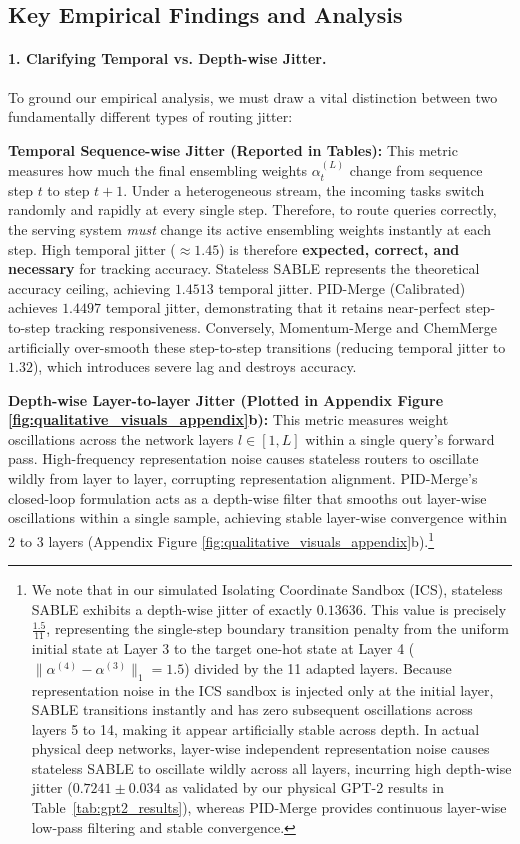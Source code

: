 \subsection{Key Empirical Findings and Analysis}

\paragraph{1. Clarifying Temporal vs. Depth-wise Jitter.}
To ground our empirical analysis, we must draw a vital distinction between two fundamentally different types of routing jitter:

\textbf{Temporal Sequence-wise Jitter (Reported in Tables):} This metric measures how much the final ensembling weights $\alpha_t^{(L)}$ change from sequence step $t$ to step $t+1$. Under a heterogeneous stream, the incoming tasks switch randomly and rapidly at every single step. Therefore, to route queries correctly, the serving system \emph{must} change its active ensembling weights instantly at each step. High temporal jitter ($\approx 1.45$) is therefore \textbf{expected, correct, and necessary} for tracking accuracy. Stateless SABLE represents the theoretical accuracy ceiling, achieving $1.4513$ temporal jitter. PID-Merge (Calibrated) achieves $1.4497$ temporal jitter, demonstrating that it retains near-perfect step-to-step tracking responsiveness. Conversely, Momentum-Merge and ChemMerge artificially over-smooth these step-to-step transitions (reducing temporal jitter to $1.32$), which introduces severe lag and destroys accuracy.

\textbf{Depth-wise Layer-to-layer Jitter (Plotted in Appendix Figure \ref{fig:qualitative_visuals_appendix}b):} This metric measures weight oscillations across the network layers $l \in [1, L]$ within a single query's forward pass. High-frequency representation noise causes stateless routers to oscillate wildly from layer to layer, corrupting representation alignment. PID-Merge's closed-loop formulation acts as a depth-wise filter that smooths out layer-wise oscillations within a single sample, achieving stable layer-wise convergence within 2 to 3 layers (Appendix Figure \ref{fig:qualitative_visuals_appendix}b).\footnote{We note that in our simulated Isolating Coordinate Sandbox (ICS), stateless SABLE exhibits a depth-wise jitter of exactly $0.13636$. This value is precisely $\frac{1.5}{11}$, representing the single-step boundary transition penalty from the uniform initial state at Layer 3 to the target one-hot state at Layer 4 ($\|\alpha^{(4)} - \alpha^{(3)}\|_1 = 1.5$) divided by the 11 adapted layers. Because representation noise in the ICS sandbox is injected only at the initial layer, SABLE transitions instantly and has zero subsequent oscillations across layers 5 to 14, making it appear artificially stable across depth. In actual physical deep networks, layer-wise independent representation noise causes stateless SABLE to oscillate wildly across all layers, incurring high depth-wise jitter ($0.7241 \pm 0.034$ as validated by our physical GPT-2 results in Table~\ref{tab:gpt2_results}), whereas PID-Merge provides continuous layer-wise low-pass filtering and stable convergence.}

